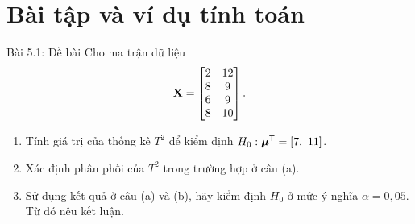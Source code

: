 \section*{Bài tập và ví dụ tính toán}

\begin{frame}{Bài 5.1: Đề bài}
    Cho ma trận dữ liệu
    \[
      \mathbf{X}=
      \begin{bmatrix}
        2 & 12\\
        8 & 9\\
        6 & 9\\
        8 & 10
      \end{bmatrix}.
    \]
    \begin{enumerate}
      \item[(a)] Tính giá trị của thống kê \(T^2\) để kiểm định \(H_0:\vect{\mu}\trans=[7,\ 11]\).
      \item[(b)] Xác định phân phối của \(T^2\) trong trường hợp ở câu (a).
      \item[(c)] Sử dụng kết quả ở câu (a) và (b), hãy kiểm định \(H_0\) ở mức ý nghĩa \(\alpha=0{,}05\). Từ đó nêu kết luận.
    \end{enumerate}
\end{frame}
 
